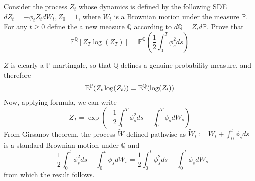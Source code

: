 \documentclass[12pt,a4paper]{exam}
\begin{document}
\begin{questions}
\begin{solution}
\begin{solution}
\question Consider the process $Z_t$ whose dynamics is defined by the following SDE $dZ_t = -\phi_tZ_tdW_t, Z_0=1$, where $W_t$ is a Brownian motion under the measure $\mathbb{P}$. For any $t\geq 0$ define the a new measure $\mathbb{Q}$ according to $d\mathbb{Q}=Z_t d\mathbb{P}$.
Prove that 
\begin{equation*}
\mathbb{E}^{\mathbb{Q}}[Z_T\log(Z_T)] = \mathbb{E}^{\mathbb{Q}}\left(\frac{1}{2}\int_0^T\phi_s^2 ds\right)
\end{equation*}

\fillwithlines{3cm}
\begin{solution}
$Z$ is clearly a $\mathbb{P}$-martingale, so that $\mathbb{Q}$ defines a genuine probability measure, and therefore
\begin{equation*}
\mathbb{E}^\mathbb{P}(Z_t\log(Z_t)) = \mathbb{E}^\mathbb{Q}(\log(Z_t))
\end{equation*}
Now, applying \ito formula, we can write
\begin{equation*}
Z_T = \exp\left(-\frac{1}{2}\int_0^T \phi_s^2 ds - \int_0^T \phi_s dW_s\right)
\end{equation*}
From Girsanov theorem, the process $\tilde{W}$ defined pathwise as $\tilde{W}_t := W_t +\int_0^t\phi_s ds$ is a standard Brownian motion under $\mathbb{Q}$ and 
\begin{equation*}
-\frac{1}{2}\int_0^t \phi_s^2 ds - \int_0^t \phi_s dW_s = \frac{1}{2}\int_0^t \phi_s^2 ds - \int_0^t \phi_s d\tilde{W}_s
\end{equation*}
from which the result follows.
\end{solution}


\end{solution}
\end{solution}
\end{questions}
\end{document}
